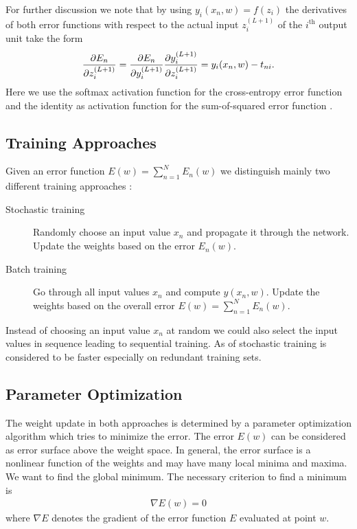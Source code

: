 For further discussion we note that by using $y_i(x_n,w) = f (z_i)$ the derivatives of both error functions with respect to the actual input $z_i^{(L+1)}$ of the $i^{\text{th}}$ output unit take the form
\begin{align}
\frac{\partial E_n}{\partial z_i^{(L+1)}} = \frac{\partial E_n}{\partial y_i^{(L+1)}} \frac{\partial y_i^{(L+1)}}{\partial z_i^{(L+1)}} = y_i(x_n,w) - t_{ni}\onedot
\end{align}
Here we use the softmax activation function for the cross-entropy error function and the identity as activation function for the sum-of-squared error function \cite[p.~230-231,236-240]{Bishop:1995}.

\subsection{Training Approaches}

Given an error function $E(w) = \sum _{n = 1} ^N E_n (w)$ we distinguish mainly two different training approaches \cite[p.~293-295]{DudaHartStork:2001}:
\begin{description}
\item[Stochastic training] Randomly choose an input value $x_n$ and propagate it through the network. Update the weights based on the error $E_n(w)$.
\item[Batch training] Go through all input values $x_n$ and compute $y(x_n,w)$. Update the weights based on the overall error $E(w) = \sum _{n = 1} ^N E_n(w)$.
\end{description}
Instead of choosing an input value $x_n$ at random we could also select the input values in sequence leading to sequential training. As of \cite[p.~240-241]{Bishop:2006} stochastic training is considered to be faster especially on redundant training sets.

\subsection{Parameter Optimization}
\label{subsec:parameter-optimization}

The weight update in both approaches is determined by a parameter optimization algorithm which tries to minimize the error. The error $E(w)$ can be considered as error surface above the weight space. In general, the error surface is a nonlinear function of the weights and may have many local minima and maxima. We want to find the global minimum. The necessary criterion to find a minimum is
\begin{align}
\nabla E (w) = 0
\end{align}
where $\nabla E$ denotes the gradient of the error function $E$ evaluated at point $w$.

